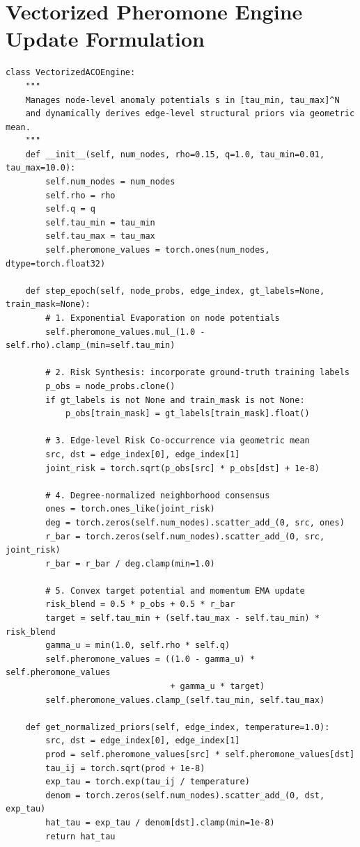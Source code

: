 \section{Vectorized Pheromone Engine Update Formulation}
\begin{footnotesize}
\begin{verbatim}
class VectorizedACOEngine:
    """
    Manages node-level anomaly potentials s in [tau_min, tau_max]^N 
    and dynamically derives edge-level structural priors via geometric mean.
    """
    def __init__(self, num_nodes, rho=0.15, q=1.0, tau_min=0.01, tau_max=10.0):
        self.num_nodes = num_nodes
        self.rho = rho
        self.q = q
        self.tau_min = tau_min
        self.tau_max = tau_max
        self.pheromone_values = torch.ones(num_nodes, dtype=torch.float32)

    def step_epoch(self, node_probs, edge_index, gt_labels=None, train_mask=None):
        # 1. Exponential Evaporation on node potentials
        self.pheromone_values.mul_(1.0 - self.rho).clamp_(min=self.tau_min)

        # 2. Risk Synthesis: incorporate ground-truth training labels
        p_obs = node_probs.clone()
        if gt_labels is not None and train_mask is not None:
            p_obs[train_mask] = gt_labels[train_mask].float()

        # 3. Edge-level Risk Co-occurrence via geometric mean
        src, dst = edge_index[0], edge_index[1]
        joint_risk = torch.sqrt(p_obs[src] * p_obs[dst] + 1e-8)

        # 4. Degree-normalized neighborhood consensus
        ones = torch.ones_like(joint_risk)
        deg = torch.zeros(self.num_nodes).scatter_add_(0, src, ones)
        r_bar = torch.zeros(self.num_nodes).scatter_add_(0, src, joint_risk)
        r_bar = r_bar / deg.clamp(min=1.0)

        # 5. Convex target potential and momentum EMA update
        risk_blend = 0.5 * p_obs + 0.5 * r_bar
        target = self.tau_min + (self.tau_max - self.tau_min) * risk_blend
        gamma_u = min(1.0, self.rho * self.q)
        self.pheromone_values = ((1.0 - gamma_u) * self.pheromone_values 
                                 + gamma_u * target)
        self.pheromone_values.clamp_(self.tau_min, self.tau_max)

    def get_normalized_priors(self, edge_index, temperature=1.0):
        src, dst = edge_index[0], edge_index[1]
        prod = self.pheromone_values[src] * self.pheromone_values[dst]
        tau_ij = torch.sqrt(prod + 1e-8)
        exp_tau = torch.exp(tau_ij / temperature)
        denom = torch.zeros(self.num_nodes).scatter_add_(0, dst, exp_tau)
        hat_tau = exp_tau / denom[dst].clamp(min=1e-8)
        return hat_tau
\end{verbatim}
\end{footnotesize}


